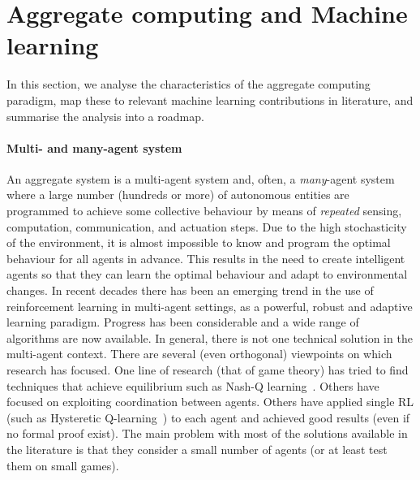 \documentclass[
twocolumn,
]{ceurart}
\begin{document}
\section{Aggregate computing and Machine learning}

In this section,
 we analyse the characteristics of the aggregate computing paradigm,
 map these to relevant machine learning contributions in literature,
 and summarise the analysis into a roadmap.

\paragraph{Multi- and many-agent system}
%
An aggregate system is a multi-agent system
 and, often, a \emph{many}-agent system
 where a large number (hundreds or more)
 of autonomous entities are programmed to achieve 
 some collective behaviour by means of \emph{repeated} 
 sensing, computation, communication, and actuation steps.
%
Due to the high stochasticity of the environment,
 it is almost impossible to know and
 program the optimal behaviour for all agents in advance.
 This results in the need to create intelligent agents
 so that they can learn the optimal behaviour and adapt to environmental changes.
%
In recent decades there has been an emerging trend in the use of reinforcement learning
 in multi-agent settings, as a powerful, robust and adaptive learning paradigm.
 Progress has been considerable and a wide range of algorithms are now available.
In general, there is not one technical solution in the multi-agent context.
 There are several (even orthogonal) viewpoints on which research has focused.
 One line of research (that of game theory) has tried to find techniques that achieve equilibrium such as Nash-Q learning~\cite{nash-q}.
 Others have focused on exploiting coordination between agents. 
 Others have applied single RL (such as Hysteretic Q-learning~\cite{hysteretic-q}) to each agent and achieved good results (even if no formal proof exist).
%
 The main problem with most of the solutions available in the literature is that they consider a small number of agents (or at least test them on small games).
\end{document}
